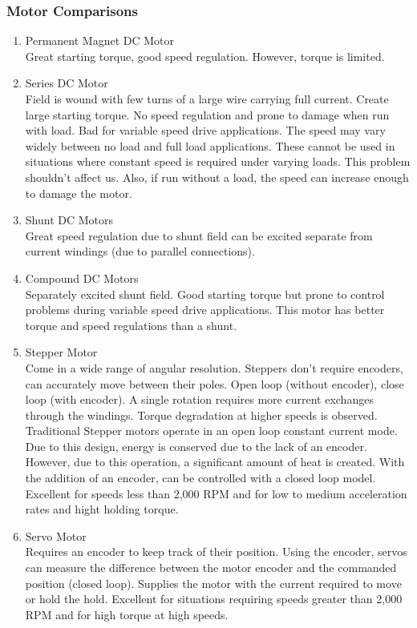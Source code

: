 	\subsubsection{Motor Comparisons}
\begin{enumerate}
	\item Permanent Magnet DC Motor
		\\ Great starting torque, good speed regulation. However, torque is limited.
    \item Series DC Motor
		\\ Field is wound with few turns of a large wire carrying full current. Create large starting torque. No speed regulation and prone to damage when run with load. Bad for variable speed drive applications. The speed may vary widely between no load and full load applications. These cannot be used in situations where constant speed is required under varying loads. This problem shouldn't affect us. Also, if run without a load, the speed can increase enough to damage the motor.
    \item Shunt DC Motors
    	\\ Great speed regulation due to shunt field can be excited separate from current windings (due to parallel connections).
    \item Compound DC Motors
    	\\ Separately excited shunt field. Good starting torque but prone to control problems during variable speed drive applications. This motor has better torque and speed regulations than a shunt.
    \item Stepper Motor
    	\\ Come in a wide range of angular resolution. Steppers don't require encoders, can accurately move between their poles. Open loop (without encoder), close loop (with encoder). A single rotation requires more current exchanges through the windings. Torque degradation at higher speeds is observed. Traditional Stepper motors operate in an open loop constant current mode. Due to this design, energy is conserved due to the lack of an encoder. However, due to this operation, a significant amount of heat is created. With the addition of an encoder, can be controlled with a closed loop model. Excellent for speeds less than 2,000 RPM and for low to medium acceleration rates and hight holding torque. 
    \item Servo Motor
    	\\ Requires an encoder to keep track of their position. Using the encoder, servos can measure the difference between the motor encoder and the commanded position (closed loop). Supplies the motor with the current required to move or hold the hold. Excellent for situations requiring speeds greater than 2,000 RPM and for high torque at high speeds. 
    
\end{enumerate}
